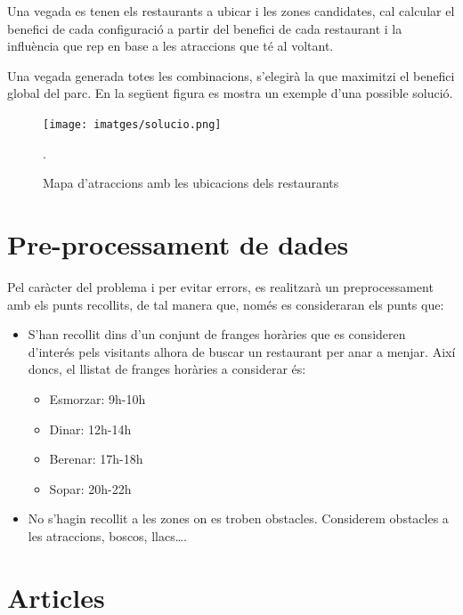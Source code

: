 \documentclass[12pt]{article}
\begin{document}
Una vegada es tenen els restaurants a ubicar i les zones candidates, cal calcular el benefici de cada configuració a partir del benefici de cada restaurant i la influència que rep en base a les atraccions que té al voltant.  

Una vegada generada totes les combinacions, s'elegirà la que maximitzi el benefici global del parc. En la següent figura es mostra un exemple d'una possible solució.

\begin{figure}[H]
	\centering
	\texttt{[image: imatges/solucio.png]}\par\vspace{1cm}
	\caption{Mapa d'atraccions amb les ubicacions dels restaurants}.
	\label{fig:mapa_restaurants}
\end{figure}


\section{Pre-processament de dades}
Pel caràcter del problema i per evitar errors, es realitzarà un preprocessament amb els punts recollits, de tal manera que, només es consideraran els punts que:
\begin{itemize}
	\item S’han recollit dins d’un conjunt de franges horàries que es consideren d'interés pels visitants alhora de buscar un restaurant per anar a menjar. 
	Així doncs, el llistat de franges horàries a considerar és:
	\begin{itemize}
		\item Esmorzar: 9h-10h
		\item Dinar: 12h-14h
		\item Berenar: 17h-18h
		\item Sopar: 20h-22h
	\end{itemize}

	\item No s’hagin recollit a les zones on es troben obstacles. 
	Considerem obstacles a les atraccions, boscos, llacs….
\end{itemize}



\clearpage
\section{Articles}
\end{document}
